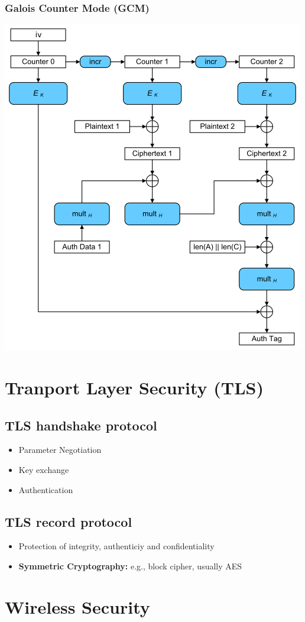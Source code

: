 \subsubsection{Galois Counter Mode (GCM)}
\begin{center}
  \includegraphics[width=0.5\columnwidth]{Resources/GCM-Galois_Counter_Mode_with_IV.svg.png}
\end{center}

\section{Tranport Layer Security (TLS)}
\subsection{TLS handshake protocol}
\begin{itemize}
  \item Parameter Negotiation
  \item Key exchange
  \item Authentication
\end{itemize}
\subsection{TLS record protocol}
\begin{itemize}
  \item Protection of integrity, authenticiy and confidentiality
  \item \textbf{Symmetric Cryptography:} e.g., block cipher, usually AES
\end{itemize}


\section{Wireless Security}
